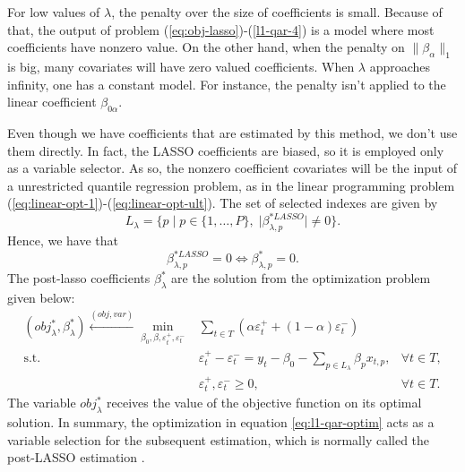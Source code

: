 For low values of $\lambda$, the penalty over the size of coefficients is small. Because of that, the output of problem (\ref{eq:obj-lasso})-(\ref{l1-qar-4}) is a model where most coefficients have nonzero value. On the other hand, when the penalty on $\| \beta_\alpha \|_1$ is big, many covariates will have zero valued coefficients. When $\lambda$ approaches infinity, one has a constant model. 
For instance, the penalty isn't applied to the linear coefficient $\beta_{0\alpha}$. 

Even though we have coefficients that are estimated by this method, we don't use them directly. In fact, the LASSO coefficients are biased, so it is employed only as a variable selector. As so, the nonzero coefficient covariates will be the input of a unrestricted quantile regression problem, as in the linear programming problem (\ref{eq:linear-opt-1})-(\ref{eq:linear-opt-ult}). 
The set of selected indexes are given by
\begin{equation*}
L_\lambda = \{ p \; | \; p \in \{ 1,\dots,P \}, \; |\beta^{*LASSO}_{\lambda,p}| \neq 0  \}.
\end{equation*}
Hence, we have that
$$\beta^{*LASSO}_{\lambda,p} = 0 \iff \beta^{*}_{\lambda,p} = 0.$$
The post-lasso coefficients $\beta_\lambda^*$ are the solution from the optimization problem given below:
\begin{equation}
\begin{aligned} (obj_{\lambda}^{*},\beta_{\lambda}^{*})\overset{(obj,var)}{\longleftarrow} \min_{\beta_0,\beta,\varepsilon_{t}^{+},\varepsilon_{t}^{-}} & \sum_{t \in T}\left(\alpha\varepsilon_{t}^{+}+(1-\alpha)\varepsilon_{t}^{-}\right) \\
\mbox{s.t. } & \varepsilon_{t}^{+}-\varepsilon_{t}^{-}=y_{t} - \beta_0 - \sum_{p\in L_\lambda} \beta_p x_{t,p},& \forall t\in T,\\
& \varepsilon_t^+,\varepsilon_t^- \geq 0, & \forall t \in T.
\end{aligned}
\label{eq:post-lasso}
\end{equation}
The variable $obj_{\lambda}^{*}$ receives the value of the objective function on its optimal solution.
In summary, the optimization in equation \ref{eq:l1-qar-optim} acts as a variable selection for the subsequent estimation, which is normally called the post-LASSO estimation \cite{belloni2009least}.


